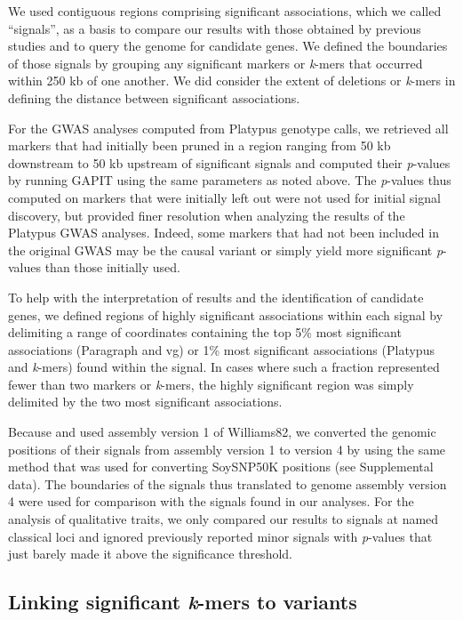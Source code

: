 We used contiguous regions comprising significant associations, which we called
``signals'', as a basis to compare our results with those obtained by previous
studies and to query the genome for candidate genes.  We defined the boundaries
of those signals by grouping any significant markers or \emph{k}-mers that
occurred within 250 kb of one another.  We did consider the extent of deletions
or \emph{k}-mers in defining the distance between significant associations.

For the GWAS analyses computed from Platypus genotype calls, we retrieved all
markers that had initially been pruned in a region ranging from 50 kb
downstream to 50 kb upstream of significant signals and computed their
\emph{p}-values by running GAPIT using the same parameters as noted above. The
\emph{p}-values thus computed on markers that were initially left out were not
used for initial signal discovery, but provided finer resolution when analyzing
the results of the Platypus GWAS analyses. Indeed, some markers that had not
been included in the original GWAS may be the causal variant or simply yield
more significant \emph{p}-values than those initially used.

To help with the interpretation of results and the identification of candidate
genes, we defined regions of highly significant associations within each signal
by delimiting a range of coordinates containing the top 5\% most significant
associations (Paragraph and vg) or 1\% most significant associations (Platypus
and \emph{k}-mers) found within the signal. In cases where such a fraction
represented fewer than two markers or \emph{k}-mers, the highly significant
region was simply delimited by the two most significant associations.

Because \cite{bandillo2015} and \cite{bandillo2017} used assembly version 1 of
Williams82, we converted the genomic positions of their signals from assembly
version 1 to version 4 by using the same method that was used for converting
SoySNP50K positions (see Supplemental data).  The
boundaries of the signals thus translated to genome assembly version 4 were
used for comparison with the signals found in our analyses. For the analysis of
qualitative traits, we only compared our results to signals at named classical
loci and ignored previously reported minor signals with \emph{p}-values that
just barely made it above the significance threshold.

\subsection*{Linking significant \emph{k}-mers to variants}
\label{sv-gwas-methods-linking-kmers}

